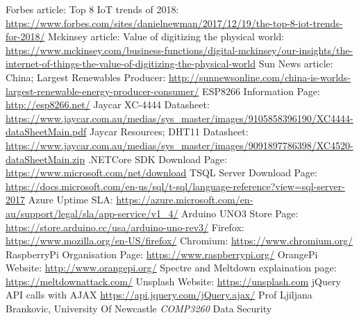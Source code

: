 \documentclass{article}
\begin{document}
    \begin{thebibliography}{9}
        \raggedright
            Forbes article: Top 8 IoT trends of 2018:
            \url{https://www.forbes.com/sites/danielnewman/2017/12/19/the-top-8-iot-trends-for-2018/}
            Mckinsey article: Value of digitizing the physical world:
            \url{https://www.mckinsey.com/business-functions/digital-mckinsey/our-insights/the-internet-of-things-the-value-of-digitizing-the-physical-world}
            Sun News article: China; Largest Renewables Producer:
            \url{http://sunnewsonline.com/china-is-worlds-largest-renewable-energy-producer-consumer/}
            ESP8266 Information Page:
            \url{http://esp8266.net/}
            Jaycar XC-4444 Datasheet:
            \url{https://www.jaycar.com.au/medias/sys_master/images/9105858396190/XC4444-dataSheetMain.pdf}
            Jaycar Resources; DHT11 Datasheet:
            \url{https://www.jaycar.com.au/medias/sys_master/images/9091897786398/XC4520-dataSheetMain.zip}
            .NETCore SDK Download Page:
            \url{https://www.microsoft.com/net/download}
            TSQL Server Download Page:
            \url{https://docs.microsoft.com/en-us/sql/t-sql/language-reference?view=sql-server-2017}
            Azure Uptime SLA:
            \url{https://azure.microsoft.com/en-au/support/legal/sla/app-service/v1_4/}
            Arduino UNO3 Store Page:
            \url{https://store.arduino.cc/usa/arduino-uno-rev3/}
            Firefox:
            \url{https://www.mozilla.org/en-US/firefox/}
            Chromium:
            \url{https://www.chromium.org/}
            RaspberryPi Organisation Page:
            \url{https://www.raspberrypi.org/}
            OrangePi Website:
            \url{http://www.orangepi.org/}
            Spectre and Meltdown explaination page:
            \url{https://meltdownattack.com/}
            Unsplash Website:
            \url{https://unsplash.com}
            jQuery API calls with AJAX
            \url{https://api.jquery.com/jQuery.ajax/}
            Prof Ljiljana Brankovic, University Of Newcastle \textit{COMP3260} Data Security
        

\end{thebibliography}
\end{document}
